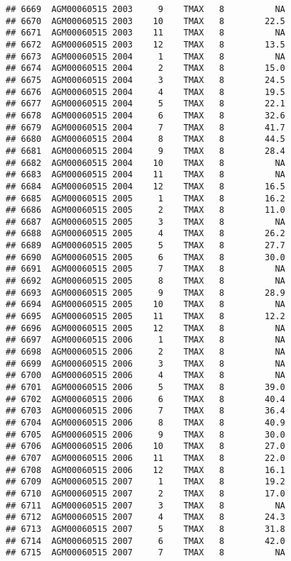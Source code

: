 \documentclass{article}\usepackage[]{graphicx}\usepackage[]{color}
\makeatletter
\newenvironment{kframe}{%
 \def\at@end@of@kframe{}%
 \ifinner\ifhmode%
  \def\at@end@of@kframe{\end{minipage}}%
  \begin{minipage}{\columnwidth}%
 \fi\fi%
 \def\FrameCommand##1{\hskip\@totalleftmargin \hskip-\fboxsep
 \colorbox{shadecolor}{##1}\hskip-\fboxsep
     \hskip-\linewidth \hskip-\@totalleftmargin \hskip\columnwidth}%
 \MakeFramed {\advance\hsize-\width
   \@totalleftmargin\z@ \linewidth\hsize
   \@setminipage}}%
 {\par\unskip\endMakeFramed%
 \at@end@of@kframe}
\newenvironment{knitrout}{}{} %
\makeatother
\begin{document}
\begin{knitrout}
\begin{kframe}
\begin{verbatim}
## 6669  AGM00060515 2003     9    TMAX   8          NA
## 6670  AGM00060515 2003    10    TMAX   8        22.5
## 6671  AGM00060515 2003    11    TMAX   8          NA
## 6672  AGM00060515 2003    12    TMAX   8        13.5
## 6673  AGM00060515 2004     1    TMAX   8          NA
## 6674  AGM00060515 2004     2    TMAX   8        15.0
## 6675  AGM00060515 2004     3    TMAX   8        24.5
## 6676  AGM00060515 2004     4    TMAX   8        19.5
## 6677  AGM00060515 2004     5    TMAX   8        22.1
## 6678  AGM00060515 2004     6    TMAX   8        32.6
## 6679  AGM00060515 2004     7    TMAX   8        41.7
## 6680  AGM00060515 2004     8    TMAX   8        44.5
## 6681  AGM00060515 2004     9    TMAX   8        28.4
## 6682  AGM00060515 2004    10    TMAX   8          NA
## 6683  AGM00060515 2004    11    TMAX   8          NA
## 6684  AGM00060515 2004    12    TMAX   8        16.5
## 6685  AGM00060515 2005     1    TMAX   8        16.2
## 6686  AGM00060515 2005     2    TMAX   8        11.0
## 6687  AGM00060515 2005     3    TMAX   8          NA
## 6688  AGM00060515 2005     4    TMAX   8        26.2
## 6689  AGM00060515 2005     5    TMAX   8        27.7
## 6690  AGM00060515 2005     6    TMAX   8        30.0
## 6691  AGM00060515 2005     7    TMAX   8          NA
## 6692  AGM00060515 2005     8    TMAX   8          NA
## 6693  AGM00060515 2005     9    TMAX   8        28.9
## 6694  AGM00060515 2005    10    TMAX   8          NA
## 6695  AGM00060515 2005    11    TMAX   8        12.2
## 6696  AGM00060515 2005    12    TMAX   8          NA
## 6697  AGM00060515 2006     1    TMAX   8          NA
## 6698  AGM00060515 2006     2    TMAX   8          NA
## 6699  AGM00060515 2006     3    TMAX   8          NA
## 6700  AGM00060515 2006     4    TMAX   8          NA
## 6701  AGM00060515 2006     5    TMAX   8        39.0
## 6702  AGM00060515 2006     6    TMAX   8        40.4
## 6703  AGM00060515 2006     7    TMAX   8        36.4
## 6704  AGM00060515 2006     8    TMAX   8        40.9
## 6705  AGM00060515 2006     9    TMAX   8        30.0
## 6706  AGM00060515 2006    10    TMAX   8        27.0
## 6707  AGM00060515 2006    11    TMAX   8        22.0
## 6708  AGM00060515 2006    12    TMAX   8        16.1
## 6709  AGM00060515 2007     1    TMAX   8        19.2
## 6710  AGM00060515 2007     2    TMAX   8        17.0
## 6711  AGM00060515 2007     3    TMAX   8          NA
## 6712  AGM00060515 2007     4    TMAX   8        24.3
## 6713  AGM00060515 2007     5    TMAX   8        31.8
## 6714  AGM00060515 2007     6    TMAX   8        42.0
## 6715  AGM00060515 2007     7    TMAX   8          NA

\end{verbatim}
\end{kframe}
\end{knitrout}
\end{document}
